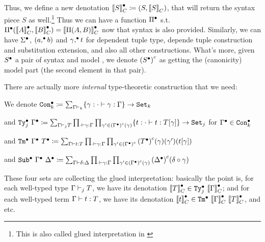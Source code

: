 Thus, we define a new denotation $\denotesCC{S} \coloneq (S, \denotesC{S})$, that will return the syntax piece $S$ as well.\footnote{This is also called glued interpretation in \citet{sterling2019algebraic}} Thus we can have a function $\Glued{\Pi}$ s.t. $\GluedPi{\denotesCC{A}}{\denotesCC{B}} = \denotesCC{\TyPi{A}{B}}$ now that syntax is also provided. Similarly, we can have $\Glued{\Sigma}$, $\Gpair{a}{b}$  and $\GSubstExt{\gm}{t}$  for dependent tuple type, depende tuple construction and substitution extension, and also all other constructions.  What's more, given $\Glued{S}$ a pair of syntax and model , we denote $\Gmodel{\Glued{S}}$ as getting the (canonicity) model part (the second element in that pair).  

\newcommand{\GTy}[2]{\ensuremath{\Glued{\texttt{Ty}}_{#1}~{#2}}}
\newcommand{\GCon}[1]{\ensuremath{\Glued{\texttt{Con}}_{#1}}}
\newcommand{\GTm}[2]{\ensuremath{\Glued{\texttt{Tm}}~{#1}~{#2}}}
\newcommand{\GSub}[2]{\ensuremath{\Glued{\texttt{Sub}}~{#1}~{#2}}}
\newcommand{\GMWSig}[3]{\ensuremath{{\texttt{WSig}^C}_{#1}^{#3}~{#2}}}
\newcommand{\GWSig}[3]{\ensuremath{{\Glued{\texttt{WSig}}}_{#1}^{#3}~{#2}}}


There are actually more \emph{internal} type-theoretic construction that we need:

We denote $\GCon{k} \coloneq \sum_{\goodCtx{\Gm}{k}} \{\gm : \goodSub{\cdot}{\gm}{\Gm} \} \to \Set{k}$ 


and $\GTy{j}{\Glued{\Gm}} \coloneq \sum_{\goodType{\Gm}{T}{j}} \prod_{\goodSub{\cdot}{\gm}{\Gm}}\prod_{\gm' \in \Gmodel{\Glued{\Gm}}(\gm)}\{t : \goodTerm{\cdot}{t}{\sub{T}{\gm}}\}\to\Set{j} $ for $\Glued{\Gm} \in \GCon{k}$

and $\GTm{\Glued{\Gm}}{\Glued{T}} \coloneq \sum_{\goodTerm{\Gm}{t}{T}} \prod_{\goodSub{\cdot}{\gm}{\Gm}} \prod_{\gm' \in\Gmodel{\Glued{\Gm}}} \Gmodel{\Glued{T}}(\gm)(\gm')(\sub{t}{\gm})$

and $\GSub{\Glued{\Gm}}{\Glued{\Dl}} \coloneq \sum_{\goodSub{\Gm}{\delta}{\Dl}} \prod_{\goodSub{\cdot}{\gm}{\Gm}} \prod_{\gm' \in \Gmodel{\Glued{\Gm}}(\gm)} \Gmodel{\Glued{\Dl}}(\delta \circ \gm) $

These four sets are collecting the glued interpretation:
basically the point is, for each well-typed type $\goodType{\Gm}{T}{j}$,  we have its denotation $\denotesCC{T} \in \GTy{j}{\denotesCC{\Gm}}$; and for each well-typed term $\goodTerm{\Gm}{t}{T}$, we have its denotation $\denotesCC{t} \in \GTm{\denotesCC{\Gm}}{\denotesCC{T}}$, and etc.


